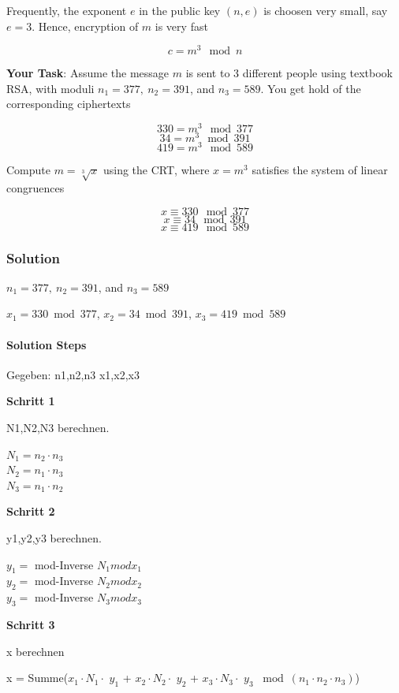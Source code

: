 \documentclass[11pt]{article}
\begin{document}
Frequently, the exponent \(e\) in the public key \((n,e)\) is choosen
very small, say \(e = 3\). Hence, encryption of \(m\) is very fast

\[ c = m^3 \mod n\]

\textbf{Your Task}: Assume the message \(m\) is sent to 3 different
people using textbook RSA, with moduli \(n_1 = 377,\ n_2 = 391\), and
\(n_3 = 589\). You get hold of the corresponding ciphertexts

\[330 = m^3 \mod 377\] \[34 = m^3 \mod 391\] \[419 = m^3 \mod 589\]

Compute \(m =\sqrt[3]{x}\) using the CRT, where \(x = m^3\) satisfies
the system of linear congruences

\[ x \equiv 330 \mod 377 \] \[ x \equiv 34  \mod 391 \]
\[ x \equiv 419 \mod 589 \]

\hypertarget{solution}{%
\subsubsection{Solution}\label{solution}}

\(n_1 = 377,\ n_2 = 391\), and \(n_3 = 589\)

\(x_1 = 330 \bmod 377\), \(x_2 = 34 \bmod 391\), \(x_3 = 419 \bmod 589\)

\hypertarget{solution-steps}{%
\paragraph{Solution Steps}\label{solution-steps}}

Gegeben: n1,n2,n3 \textbar{} x1,x2,x3

\textbf{Schritt 1}

N1,N2,N3 berechnen.

\(N_1 = n_2 \cdot n_3\)\\
\(N_2 = n_1 \cdot n_3\)\\
\(N_3 = n_1 \cdot n_2\)

\textbf{Schritt 2}

y1,y2,y3 berechnen.

\(y_1 =\) mod-Inverse \(N_1 mod x_1\)\\
\(y_2 =\) mod-Inverse \(N_2 mod x_2\)\\
\(y_3 =\) mod-Inverse \(N_3 mod x_3\)

\textbf{Schritt 3}

x berechnen

x = Summe(\(x_1 \cdot N_1 \cdot\) \(y_1\) + \(x_2 \cdot N_2 \cdot\)
\(y_2\) + \(x_3 \cdot N_3 \cdot\) \(y_3\)
\(\bmod (n_1 \cdot n_2 \cdot n_3 )\))
\end{document}
